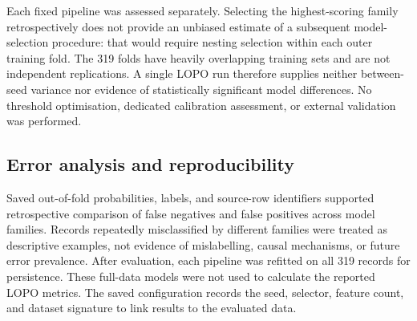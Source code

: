 Each fixed pipeline was assessed separately. Selecting the highest-scoring family retrospectively does not provide an unbiased estimate of a subsequent model-selection procedure: that would require nesting selection within each outer training fold. The 319 folds have heavily overlapping training sets and are not independent replications. A single LOPO run therefore supplies neither between-seed variance nor evidence of statistically significant model differences. No threshold optimisation, dedicated calibration assessment, or external validation was performed.

\subsection{Error analysis and reproducibility}
Saved out-of-fold probabilities, labels, and source-row identifiers supported retrospective comparison of false negatives and false positives across model families. Records repeatedly misclassified by different families were treated as descriptive examples, not evidence of mislabelling, causal mechanisms, or future error prevalence. After evaluation, each pipeline was refitted on all 319 records for persistence. These full-data models were not used to calculate the reported LOPO metrics. The saved configuration records the seed, selector, feature count, and dataset signature to link results to the evaluated data.
